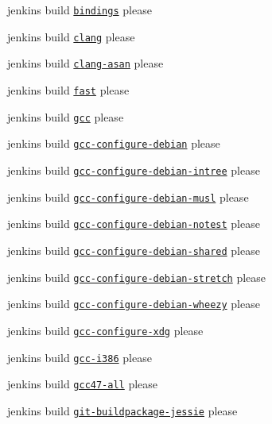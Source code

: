\begin{DoxyItemize}
\item jenkins build \href{http://build.libelektra.org:8080/job/elektra-test-bindings/}{\tt bindings} please
\item jenkins build \href{http://build.libelektra.org:8080/job/elektra-clang/}{\tt clang} please
\item jenkins build \href{http://build.libelektra.org:8080/job/elektra-clang-asan/}{\tt clang-\/asan} please
\item jenkins build \href{http://build.libelektra.org:8080/job/elektra-mergerequests-fast/}{\tt fast} please
\item jenkins build \href{http://build.libelektra.org:8080/job/elektra-gcc/}{\tt gcc} please
\item jenkins build \href{http://build.libelektra.org:8080/job/elektra-gcc-configure-debian/}{\tt gcc-\/configure-\/debian} please
\item jenkins build \href{http://build.libelektra.org:8080/job/elektra-gcc-configure-debian-intree/}{\tt gcc-\/configure-\/debian-\/intree} please
\item jenkins build \href{http://build.libelektra.org:8080/job/elektra-gcc-configure-debian-musl/}{\tt gcc-\/configure-\/debian-\/musl} please
\item jenkins build \href{http://build.libelektra.org:8080/job/elektra-gcc-configure-debian-notest/}{\tt gcc-\/configure-\/debian-\/notest} please
\item jenkins build \href{http://build.libelektra.org:8080/job/elektra-gcc-configure-debian-shared/}{\tt gcc-\/configure-\/debian-\/shared} please
\item jenkins build \href{http://build.libelektra.org:8080/job/elektra-gcc-configure-debian-stretch/}{\tt gcc-\/configure-\/debian-\/stretch} please
\item jenkins build \href{http://build.libelektra.org:8080/job/elektra-gcc-configure-debian-wheezy/}{\tt gcc-\/configure-\/debian-\/wheezy} please
\item jenkins build \href{http://build.libelektra.org:8080/job/elektra-gcc-configure-xdg/}{\tt gcc-\/configure-\/xdg} please
\item jenkins build \href{http://build.libelektra.org:8080/job/elektra-gcc-i386/}{\tt gcc-\/i386} please
\item jenkins build \href{http://build.libelektra.org:8080/job/elektra-gcc47-all/}{\tt gcc47-\/all} please
\item jenkins build \href{http://build.libelektra.org:8080/job/elektra-git-buildpackage-jessie/}{\tt git-\/buildpackage-\/jessie} please

\end{DoxyItemize}
